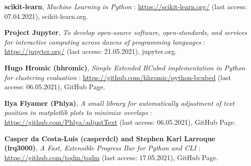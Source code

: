 \begin{thebibliography}{9}
\textbf{scikit-learn},
\textit{Machine Learning in Python} : \url{https://scikit-learn.org/} (last access: 07.04.2021),
scikit-learn.org.

\textbf{Project Jupyter},
\textit{To develop open-source software, open-standards, and services for interactive computing across dozens of programming languages} : \url{https://jupyter.org/} (last access: 21.05.2021),
jupyter.org.

\textbf{Hugo Hromic (hhromic)},
\textit{Simple Extended BCubed implementation in Python for clustering evaluation} : \url{https://github.com/hhromic/python-bcubed} (last access: 06.05.2021),
GitHub Page.

\textbf{Ilya Flyamer (Phlya)},
\textit{A small library for automatically adjustment of text position in matplotlib plots to minimize overlaps} : \url{https://github.com/Phlya/adjustText} (last access: 06.05.2021),
GitHub Page.

\textbf{Casper da Costa-Luis (casperdcl) and Stephen Karl Larroque (lrq3000)},
\textit{A Fast, Extensible Progress Bar for Python and CLI} : \url{https://github.com/tqdm/tqdm} (last access: 17.05.2021),
GitHub Page.

\end{thebibliography}

